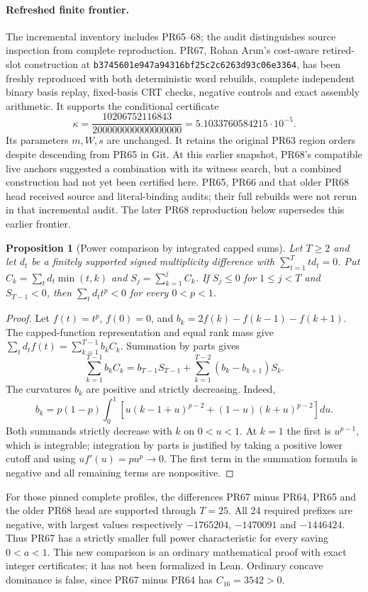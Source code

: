 \documentclass[11pt]{article}
\newtheorem{proposition}[theorem]{Proposition}
\begin{document}
\paragraph{Refreshed finite frontier.}
The incremental inventory includes PR65--68; the audit distinguishes source
inspection from complete reproduction. PR67, Rohan Arun's cost-aware
retired-slot construction at
\texttt{b3745601e947a94316bf25c2c6263d93c06e3364}, has been freshly
reproduced with both deterministic word rebuilds, complete independent
binary basis replay, fixed-basis CRT checks, negative controls and exact
assembly arithmetic. It supports the conditional certificate
\[
 \kappa=\frac{10206752116843}{200000000000000000}
       =5.1033760584215\cdot10^{-5}.
\]
Its parameters $m,W,s$ are unchanged. It retains the original PR63
region orders despite descending from PR65 in Git. At this earlier snapshot,
PR68's compatible live anchors suggested a combination with its witness
search, but a combined construction had not yet been certified here.
PR65, PR66 and that older PR68 head received source and literal-binding
audits; their full rebuilds were not rerun in that incremental audit.
The later PR68 reproduction below supersedes this earlier frontier.

\begin{proposition}[Power comparison by integrated capped sums]
Let $T\ge2$ and let $d_t$ be a finitely supported signed multiplicity difference with
$\sum_{t=1}^T td_t=0$. Put
$C_k=\sum_t d_t\min(t,k)$ and $S_j=\sum_{k=1}^j C_k$.
If $S_j\le0$ for $1\le j<T$ and $S_{T-1}<0$, then
$\sum_t d_t t^p<0$ for every $0<p<1$.
\end{proposition}
\begin{proof}
Let $f(t)=t^p$, $f(0)=0$, and
$b_k=2f(k)-f(k-1)-f(k+1)$. The capped-function representation and equal
rank mass give $\sum_t d_t f(t)=\sum_{k=1}^{T-1}b_kC_k$.
Summation by parts gives
\[
 \sum_{k=1}^{T-1}b_kC_k
 =b_{T-1}S_{T-1}+\sum_{k=1}^{T-2}(b_k-b_{k+1})S_k.
\]
The curvatures $b_k$ are positive and strictly decreasing. Indeed,
\[
 b_k=p(1-p)\int_0^1\!\left[
 u(k-1+u)^{p-2}+(1-u)(k+u)^{p-2}\right]du.
\]
Both summands strictly decrease with $k$ on $0<u<1$. At $k=1$ the
first is $u^{p-1}$, which is integrable; integration by parts is
justified by taking a positive lower cutoff and using
$u f'(u)=pu^p\to0$. The first term in the summation formula is negative
and all remaining terms are nonpositive.
\end{proof}
For those pinned complete profiles, the differences PR67 minus PR64,
PR65 and the older PR68 head are supported through $T=25$. All 24 required prefixes
are negative, with largest values respectively $-1765204$, $-1470091$
and $-1446424$. Thus PR67 has a strictly smaller full power
characteristic for every saving $0<a<1$. This new comparison is an
ordinary mathematical proof with exact integer certificates; it has not
been formalized in Lean. Ordinary concave dominance is false, since
PR67 minus PR64 has $C_{16}=3542>0$.
\end{document}
